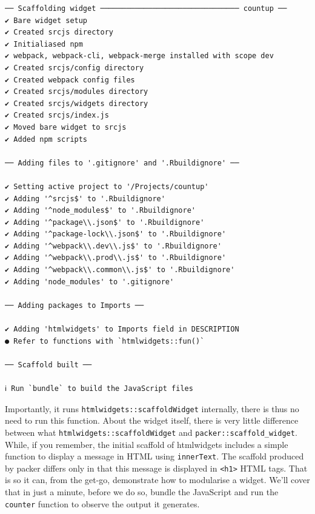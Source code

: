 \documentclass[10pt,]{krantz}
\begin{document}
\begin{verbatim}
── Scaffolding widget ──────────────────────────────── countup ── 
✔ Bare widget setup
✔ Created srcjs directory
✔ Initialiased npm
✔ webpack, webpack-cli, webpack-merge installed with scope dev
✔ Created srcjs/config directory
✔ Created webpack config files
✔ Created srcjs/modules directory
✔ Created srcjs/widgets directory
✔ Created srcjs/index.js
✔ Moved bare widget to srcjs
✔ Added npm scripts

── Adding files to '.gitignore' and '.Rbuildignore' ──

✔ Setting active project to '/Projects/countup'
✔ Adding '^srcjs$' to '.Rbuildignore'
✔ Adding '^node_modules$' to '.Rbuildignore'
✔ Adding '^package\\.json$' to '.Rbuildignore'
✔ Adding '^package-lock\\.json$' to '.Rbuildignore'
✔ Adding '^webpack\\.dev\\.js$' to '.Rbuildignore'
✔ Adding '^webpack\\.prod\\.js$' to '.Rbuildignore'
✔ Adding '^webpack\\.common\\.js$' to '.Rbuildignore'
✔ Adding 'node_modules' to '.gitignore'

── Adding packages to Imports ──

✔ Adding 'htmlwidgets' to Imports field in DESCRIPTION
● Refer to functions with `htmlwidgets::fun()`

── Scaffold built ──

ℹ Run `bundle` to build the JavaScript files
\end{verbatim}

Importantly, it runs \texttt{htmlwidgets::scaffoldWidget} internally, there is thus no need to run this function. About the widget itself, there is very little difference between what \texttt{htmlwidgets::scaffoldWidget} and \texttt{packer::scaffold\_widget}. While, if you remember, the initial scaffold of htmlwidgets includes a simple function to display a message in HTML using \texttt{innerText}. The scaffold produced by packer differs only in that this message is displayed in \texttt{\textless{}h1\textgreater{}} HTML tags. That is so it can, from the get-go, demonstrate how to modularise a widget. We'll cover that in just a minute, before we do so, bundle the JavaScript and run the \texttt{counter} function to observe the output it generates.
\end{document}
